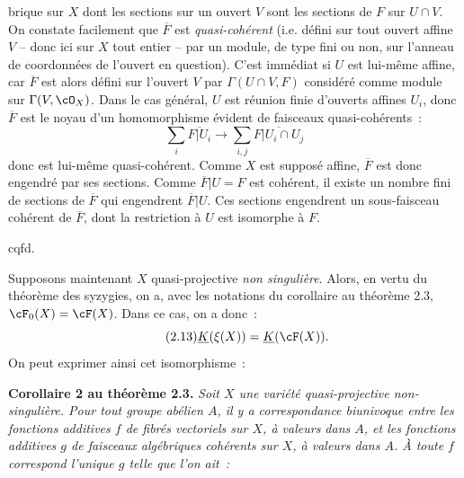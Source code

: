 brique sur $X$ dont les sections sur un ouvert $V$ sont les sections de $F$ sur $U\cap V$. On constate facilement que $\overline F$ est \emph{quasi-cohérent} (i.e. défini sur tout ouvert affine $V$ -- donc ici sur $X$ tout entier -- par un module, de type fini ou non, sur l'anneau de coordonnées de l'ouvert en question). C'est immédiat si $U$ est lui-même affine, car $\overline F$ est alors défini sur l'ouvert $V$ par $\Gamma(U\cap V,F)$ considéré comme module sur $\Gamma(V,\cO_X)$. Dans le cas général, $U$ est réunion finie d'ouverts affines $U_i$, donc $\overline F$ est le noyau d'un homomorphisme évident de faisceaux quasi-cohérents~:
\[
 \sum_i \overline{F|U_i}\longrightarrow \sum_{i,j}\overline{F|U_i\cap U_j}
\]
donc est lui-même quasi-cohérent. Comme $X$ est supposé affine, $\overline F$ est donc engendré par ses sections. Comme $\overline F|U=F$ est cohérent, il existe un nombre fini de sections de $\overline F$ qui engendrent $\overline F|U$. Ces sections engendrent un sous-faisceau cohérent de $\overline F$, dont la restriction à $U$ est isomorphe à $F$.
\begin{flushright}cqfd.\end{flushright}

Supposons maintenant $X$ quasi-projective \emph{non singulière}. Alors, en vertu du théorème des syzygies, on a, avec les notations du corollaire au théorème 2.3, $\cF_0(X)=\cF(X)$. Dans ce cas, on a donc~:
\begin{equation}\tag{2.13}
 \underline{K}(\xi(X))=\underline{K}(\cF(X)).
\end{equation}
On peut exprimer ainsi cet isomorphisme~:

\textbf{Corollaire 2 au théorème 2.3.} \emph{Soit $X$ une variété quasi-projective non-singulière. Pour tout groupe abélien $A$, il y a correspondance biunivoque entre les fonctions additives $f$ de fibrés vectoriels sur $X$, à valeurs dans $A$, et les fonctions additives $g$ de faisceaux algébriques cohérents sur $X$, à valeurs dans $A$. À toute $f$ correspond l'unique $g$ telle que l'on ait~:}
